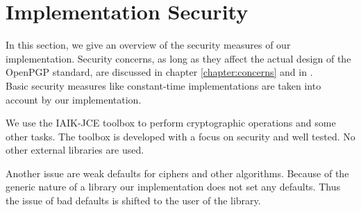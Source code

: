 \newpage

\section{Implementation Security}
In this section, we give an overview of the security measures of our implementation. 
Security concerns, as long as they affect the actual design of the OpenPGP standard, are discussed in chapter \ref{chapter:concerns} and in \cite[section 14]{RFC4880}.  \\

Basic security measures like constant-time implementations are taken into account by our implementation. 

We use the IAIK-JCE toolbox to perform cryptographic operations and some other tasks. The toolbox is developed with a focus on security and well tested. No other external libraries are used. 

Another issue are weak defaults for ciphers and other algorithms. Because of the generic nature of a library our implementation does not set any defaults. Thus the issue of bad defaults is shifted to the user of the library. \\







